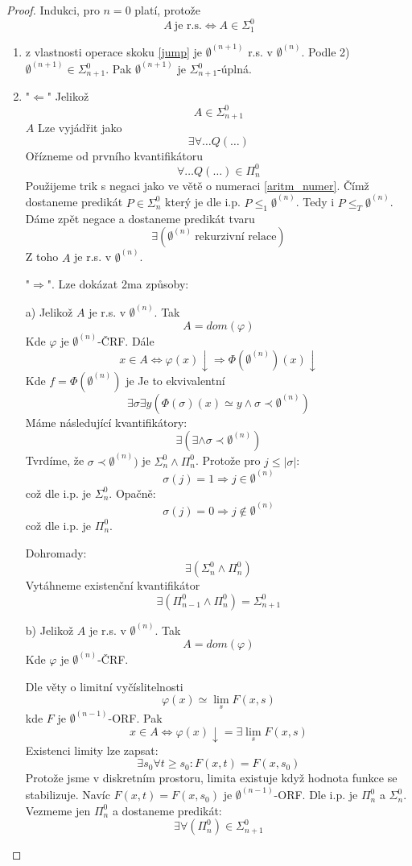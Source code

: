 \begin{proof}
	Indukci, pro $n = 0$ platí, protože
	\[ A\ \text{je r.s.} \iff A \in \Sigma_1^0 \]
	\begin{enumerate}
		\item z vlastnosti operace skoku \cref{jump} je $\emptyset^{(n + 1)}$ r.s. v $\emptyset^{(n)}$.
			Podle 2) $\emptyset^{(n + 1)} \in \Sigma_{n + 1}^0$.
			Pak $\emptyset^{(n + 1)}$ je $\Sigma_{n + 1}^0$-úplná.
		\item "$\Leftarrow$" Jelikož
			\[ A \in \Sigma_{n + 1}^0 \]
			$A$ Lze vyjádřit jako
			\[ \exists \forall \ldots Q(\ldots) \]
			Ořízneme od prvního kvantifikátoru
			\[ \forall \ldots Q(\ldots) \in \Pi_n^0 \]
			Použijeme trik s negaci jako ve větě o numeraci \cref{aritm_numer}.
			Čímž dostaneme predikát $P \in \Sigma_{n}^0$ který je dle i.p. $P \leq_1 \emptyset^{(n)}$.
			Tedy i $P \leq_T \emptyset^{(n)}$.
			Dáme zpět negace a dostaneme predikát tvaru
			\[ \exists (\emptyset^{(n)}\ \text{rekurzivní relace}) \]
			Z toho $A$ je r.s. v $\emptyset^{(n)}$.

		"$\Rightarrow$". Lze dokázat 2ma způsoby:

			a) Jelikož $A$ je r.s. v $\emptyset^{(n)}$. Tak
			\[ A = dom(\varphi) \]
			Kde $\varphi$ je $\emptyset^{(n)}$-ČRF.
			Dále
			\[ x \in A \iff \varphi(x) \downarrow \Rightarrow \Phi(\emptyset^{(n)})(x) \downarrow \]
			Kde $f = \Phi(\emptyset^{(n)})$ je %
			Je to ekvivalentní
			\[ \exists \sigma \exists y(\Phi(\sigma)(x) \simeq y \land \sigma \prec \emptyset^{(n)}) \]
			Máme následující kvantifikátory:
			\[ \exists (\exists \land \sigma \prec \emptyset^{(n)}) \]
			Tvrdíme, že $\sigma \prec \emptyset^{(n)})$ je $\Sigma_n^0 \land \Pi_n^0$.
			Protože pro $j \leq |\sigma|$:
			\[ \sigma(j) = 1 \Rightarrow j \in \emptyset^{(n)} \]
			což dle i.p. je $\Sigma_n^0$.
			Opačně:
			\[ \sigma(j) = 0 \Rightarrow j \notin \emptyset^{(n)} \]
			což dle i.p. je $\Pi_n^0$.

			Dohromady:
			\[ \exists(\Sigma_n^0 \land \Pi_n^0)\]
			Vytáhneme existenční kvantifikátor
			\[\exists(\Pi_{n - 1}^0 \land \Pi_n^0) = \Sigma_{n + 1}^0 \]

			b) Jelikož $A$ je r.s. v $\emptyset^{(n)}$. Tak
			\[ A = dom(\varphi) \]
			Kde $\varphi$ je $\emptyset^{(n)}$-ČRF.

			Dle věty o limitní vyčíslitelnosti %
			\[ \varphi(x) \simeq \lim_s F(x, s) \]
			kde $F$ je $\emptyset^{(n - 1)}$-ORF. Pak
			\[ x \in A \iff \varphi(x) \downarrow = \exists \lim_s F(x, s) \]
			Existenci limity lze zapsat:
			\[ \exists s_0 \forall t \geq s_0: F(x, t) = F(x, s_0) \]
			Protože jsme v diskretním prostoru, limita existuje když hodnota funkce se stabilizuje.
			Navíc $F(x, t) = F(x, s_0)$ je $\emptyset^{(n - 1)}$-ORF.
			Dle i.p. je $\Pi_n^0$ a $\Sigma_n^0$.
			Vezmeme jen $\Pi_n^0$ a dostaneme predikát:
			\[ \exists \forall(\Pi_n^0) \in \Sigma_{n + 1}^0 \]


\end{enumerate}
\end{proof}
